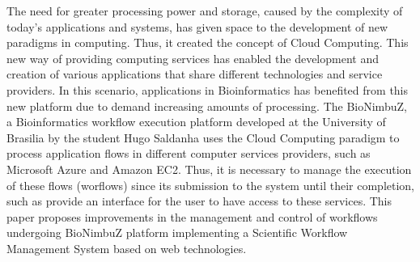 The need for greater processing power and storage, caused by the complexity of today's applications and systems, has given space to the development of new paradigms in computing. Thus, it created the concept of Cloud Computing. This new way of providing computing services has enabled the development and creation of various applications that share different technologies and service providers. In this scenario, applications in Bioinformatics has benefited from this new platform due to demand increasing amounts of processing. The BioNimbuZ, a Bioinformatics workflow execution platform developed at the University of Brasilia by the student Hugo Saldanha uses the Cloud Computing paradigm to process application flows in different computer services providers, such as Microsoft Azure and Amazon EC2. Thus, it is necessary to manage the execution of these flows (worflows) since its submission to the system until their completion, such as provide an interface for the user to have access to these services. This paper proposes improvements in the management and control of workflows undergoing BioNimbuZ platform implementing a Scientific Workflow Management System based on web technologies.
